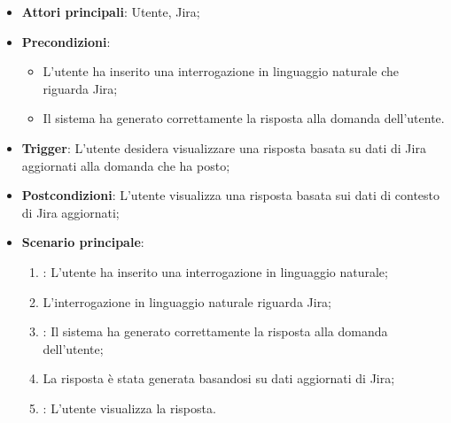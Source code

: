 \begin{itemize}
    \item \textbf{Attori principali}: Utente, Jira;
    \item \textbf{Precondizioni}: 
    \begin{itemize}
        \item L'utente ha inserito una interrogazione in linguaggio naturale che riguarda Jira;
        \item Il sistema ha generato correttamente la risposta alla domanda dell'utente.
    \end{itemize}
    \item \textbf{Trigger}: L'utente desidera visualizzare una risposta basata su dati di Jira aggiornati alla domanda che ha posto;
    \item \textbf{Postcondizioni}: L'utente visualizza una risposta basata sui dati di contesto di Jira aggiornati;
    \item \textbf{Scenario principale}: 
    \begin{enumerate}
        \item {}: L'utente ha inserito una interrogazione in linguaggio naturale;
        \item L'interrogazione in linguaggio naturale riguarda Jira;
        \item {}: Il sistema ha generato correttamente la risposta alla domanda dell'utente;
        \item La risposta è stata generata basandosi su dati aggiornati di Jira;
        \item {}: L'utente visualizza la risposta.
    \end{enumerate}
\end{itemize}



\hypertarget{UC11.3}{}

